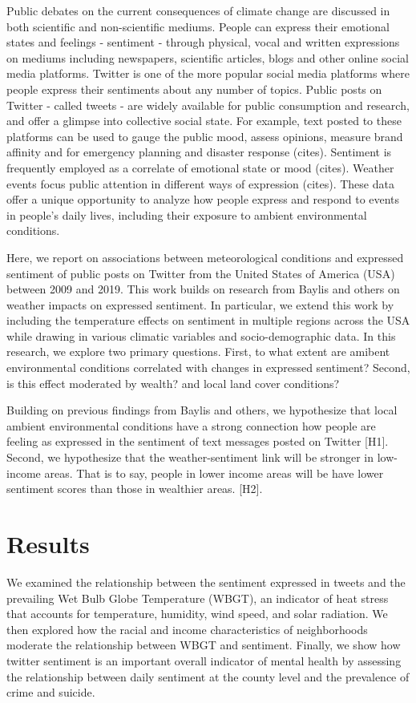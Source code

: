 \documentclass{article}
\begin{document}
Public debates on the current consequences of climate change are discussed in both scientific and non-scientific mediums. People can express their emotional states and feelings - sentiment - through physical, vocal and written expressions on mediums including newspapers, scientific articles, blogs and other online social media platforms. Twitter is one of the more popular social media platforms where people express their sentiments about any number of topics. Public posts on Twitter - called tweets - are widely available for public consumption and research, and offer a glimpse into collective social state. For example, text posted to these platforms can be used to gauge the public mood, assess opinions, measure brand affinity and for emergency planning and disaster response (cites). Sentiment is frequently employed as a correlate of emotional state or mood (cites). Weather events focus public attention in different ways of expression (cites). These data offer a unique opportunity to analyze how people express and respond to events in people's daily lives, including their exposure to ambient environmental conditions.



Here, we report on associations between meteorological conditions and expressed sentiment of public posts on Twitter from the United States of America (USA) between 2009 and 2019. This work builds on research from Baylis and others \cite{baylis_weather_2018} on weather impacts on expressed sentiment. In particular, we extend this work by including the temperature effects on sentiment in multiple regions across the USA while drawing in various climatic variables and socio-demographic data. In this research, we explore two primary questions. First, to what extent are amibent environmental conditions correlated with changes in expressed sentiment? Second, is this effect moderated by wealth? and local land cover conditions?

Building on previous findings from Baylis and others, we hypothesize that local ambient environmental conditions have a strong connection how people are feeling as expressed in the sentiment of text messages posted on Twitter [H1]. Second, we hypothesize that the weather-sentiment link will be stronger in low-income areas. That is to say, people in lower income areas will be have lower sentiment scores than those in wealthier areas. [H2].

\section{Results}
We examined the relationship between the sentiment expressed in tweets and the prevailing Wet Bulb Globe Temperature (WBGT), an indicator of heat stress that accounts for temperature, humidity, wind speed, and solar radiation.  We then explored how the racial and income characteristics of neighborhoods moderate the relationship between WBGT and sentiment.  Finally, we show how twitter sentiment is an important overall indicator of mental health by assessing the relationship between daily sentiment at the county level and the prevalence of crime and suicide. 
\end{document}
